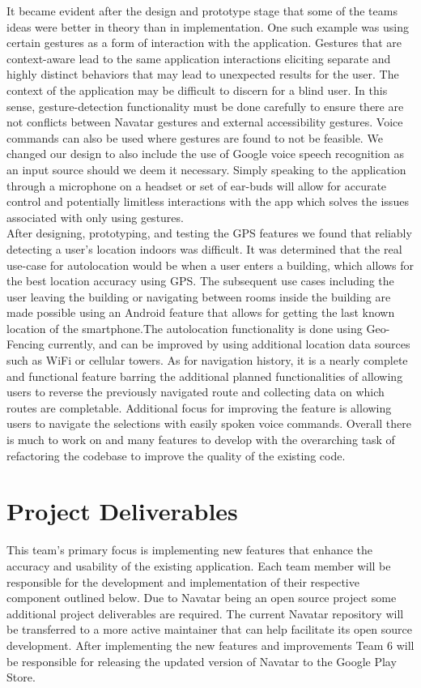 \documentclass{scrreprt}
\begin{document}
It became evident after the design and prototype stage that some of the team\textsc{}s ideas were better in theory than in implementation. One such example was using certain gestures as a form of interaction with the application. Gestures that are context-aware lead to the same application interactions eliciting separate and highly distinct behaviors that may lead to unexpected results for the user. The context of the application may be difficult to discern for a blind user. In this sense, gesture-detection functionality must be done carefully to ensure there are not conflicts between Navatar gestures and external accessibility gestures. Voice commands can also be used where gestures are found to not be feasible. We changed our design to also include the use of Google voice speech recognition as an input source should we deem it necessary. Simply speaking to the application through a microphone on a headset or set of ear-buds will allow for accurate control and potentially limitless interactions with the app which solves the issues associated with only using gestures.\\

After designing, prototyping, and testing the GPS features we found that reliably detecting a user’s location indoors was difficult. It was determined that the real use-case for autolocation would be when a user enters a building, which allows for the best location accuracy using GPS. The subsequent use cases including the user leaving the building or navigating between rooms inside the building are made possible using an Android feature that allows for getting the last known location of the smartphone.The autolocation functionality is done using Geo-Fencing currently, and can be improved by using additional location data sources such as WiFi or cellular towers. As for navigation history, it is a nearly complete and functional feature barring the additional planned functionalities of allowing users to reverse the previously navigated route and collecting data on which routes are completable. Additional focus for improving the feature is allowing users to navigate the selections with easily spoken voice commands. Overall there is much to work on and many features to develop with the overarching task of refactoring the codebase to improve the quality of the existing code.

\chapter{Project Deliverables}
This team’s primary focus is implementing new features that enhance the accuracy and usability of the existing application. Each team member will be responsible for the development and implementation of their respective component outlined below. Due to Navatar being an open source project some additional project deliverables are required. The current Navatar repository will be transferred to a more active maintainer that can help facilitate its open source development. After implementing the new features and improvements Team 6 will be responsible for releasing the updated version of Navatar to the Google Play Store.
\end{document}
